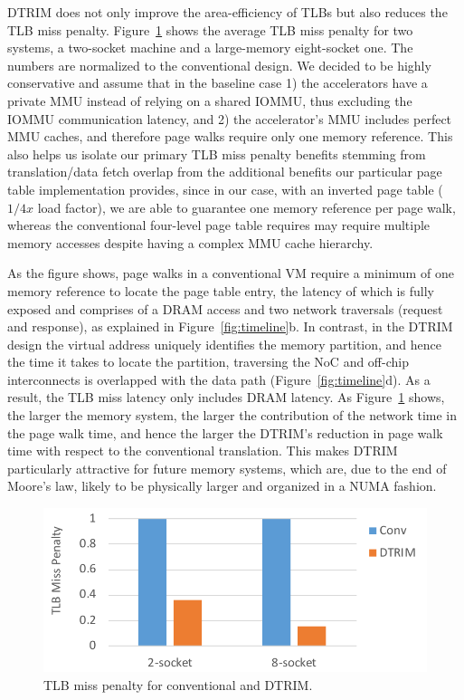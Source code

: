 DTRIM does not only improve the area-efficiency of TLBs but also reduces the TLB miss penalty. Figure~\ref{fig:penalty} shows the average TLB miss penalty for two systems, a two-socket machine and a large-memory eight-socket one. The numbers are normalized to the conventional design. We decided to be highly conservative and assume that in the baseline case 1) the accelerators have a private MMU instead of relying on a shared IOMMU, thus excluding the IOMMU communication latency, and 2) the accelerator's MMU includes perfect MMU caches, and therefore page walks require only one memory reference. This also helps us isolate our primary TLB miss penalty benefits stemming from translation/data fetch overlap from the additional benefits our particular page table implementation provides, since in our case, with an inverted page table ($1/4x$ load factor), we are able to guarantee one memory reference per page walk, whereas the conventional four-level page table requires may require multiple memory accesses despite having a complex MMU cache hierarchy.

As the figure shows, page walks in a conventional VM require a minimum of one memory reference to locate the page table entry, the latency of which is fully exposed and comprises of a DRAM access and two network traversals (request and response), as explained in Figure~\ref{fig:timeline}b. In contrast, in the DTRIM design the virtual address uniquely identifies the memory partition, and hence the time it takes to locate the partition, traversing the NoC and off-chip interconnects is overlapped with the data path (Figure~\ref{fig:timeline}d). As a result, the TLB miss latency only includes DRAM latency. As Figure~\ref{fig:penalty} shows, the larger the memory system, the larger the contribution of the network time in the page walk time, and hence the larger the DTRIM's reduction in page walk time with respect to the conventional translation. This makes DTRIM particularly attractive for future memory systems, which are, due to the end of Moore's law, likely to be physically larger and organized in a NUMA fashion.

\begin{figure}[t]
	\centering
	\includegraphics[width=1.0\columnwidth]{graphs/penalty.pdf}
	\caption{TLB miss penalty for conventional and DTRIM.}
	\label{fig:penalty}
\end{figure}



